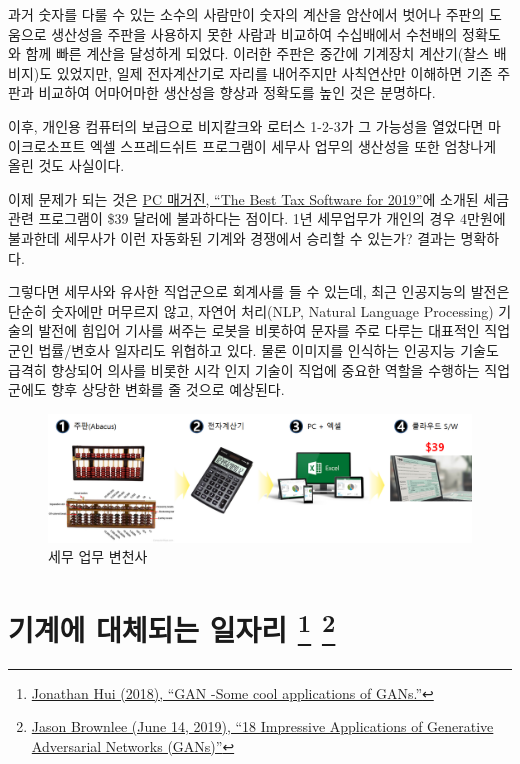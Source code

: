 \documentclass[smallextended]{svjour3}       %
\begin{document}
과거 숫자를 다룰 수 있는 소수의 사람만이 숫자의 계산을 암산에서 벗어나
주판의 도움으로 생산성을 주판을 사용하지 못한 사람과 비교하여 수십배에서
수천배의 정확도와 함께 빠른 계산을 달성하게 되었다. 이러한 주판은 중간에
기계장치 계산기(찰스 배비지)도 있었지만, 일제 전자계산기로 자리를
내어주지만 사칙연산만 이해하면 기존 주판과 비교하여 어마어마한 생산성을
향상과 정확도를 높인 것은 분명하다.

이후, 개인용 컴퓨터의 보급으로 비지칼크와 로터스 1-2-3가 그 가능성을
열었다면 마이크로소프트 엑셀 스프레드쉬트 프로그램이 세무사 업무의
생산성을 또한 엄창나게 올린 것도 사실이다.

이제 문제가 되는 것은
\href{https://www.pcmag.com/roundup/167894/the-best-tax-software}{PC
매거진, ``The Best Tax Software for 2019''}에 소개된 세금관련 프로그램이
\$39 달러에 불과하다는 점이다. 1년 세무업무가 개인의 경우 4만원에
불과한데 세무사가 이런 자동화된 기계와 경쟁에서 승리할 수 있는가? 결과는
명확하다.

그렇다면 세무사와 유사한 직업군으로 회계사를 들 수 있는데, 최근
인공지능의 발전은 단순히 숫자에만 머무르지 않고, 자연어 처리(NLP,
Natural Language Processing) 기술의 발전에 힘입어 기사를 써주는 로봇을
비롯하여 문자를 주로 다루는 대표적인 직업군인 법률/변호사 일자리도
위협하고 있다. 물론 이미지를 인식하는 인공지능 기술도 급격히 향상되어
의사를 비롯한 시각 인지 기술이 직업에 중요한 역할을 수행하는 직업군에도
향후 상당한 변화를 줄 것으로 예상된다.

\begin{figure}

{\centering \includegraphics[width=1\linewidth]{fig/tax-preparation} 

}

\caption{세무 업무 변천사}\label{fig:unnamed-chunk-1}
\end{figure}

\hypertarget{challenge-to-human}{%
\section[기계에 대체되는 일자리 ]{\texorpdfstring{기계에 대체되는 일자리
\footnote{\href{https://medium.com/@jonathan_hui/gan-some-cool-applications-of-gans-4c9ecca35900}{Jonathan
  Hui (2018), ``GAN -Some cool applications of GANs.''}}
\footnote{\href{https://machinelearningmastery.com/impressive-applications-of-generative-adversarial-networks/}{Jason
  Brownlee (June 14, 2019), ``18 Impressive Applications of Generative
  Adversarial Networks (GANs)''}}}{기계에 대체되는 일자리  }}\label{challenge-to-human}}
\end{document}
